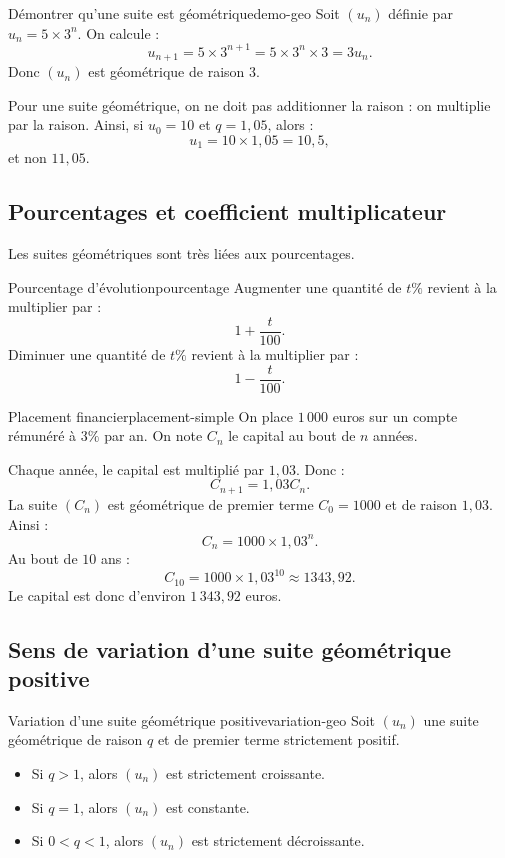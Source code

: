 \documentclass[11pt,a4paper]{article}
\begin{document}
\begin{examplebox}{Démontrer qu'une suite est géométrique}{demo-geo}
Soit $(u_n)$ définie par $u_n=5\times 3^n$.
On calcule :
\[
 u_{n+1}=5\times 3^{n+1}=5\times 3^n\times 3=3u_n.
\]
Donc $(u_n)$ est géométrique de raison $3$.
\end{examplebox}

\begin{warningbox}
Pour une suite géométrique, on ne doit pas additionner la raison : on multiplie par la raison.
Ainsi, si $u_0=10$ et $q=1{,}05$, alors :
\[
 u_1=10\times1{,}05=10{,}5,
\]
et non $11{,}05$.
\end{warningbox}

\subsection{Pourcentages et coefficient multiplicateur}

Les suites géométriques sont très liées aux pourcentages.

\begin{propositionbox}{Pourcentage d'évolution}{pourcentage}
Augmenter une quantité de $t\%$ revient à la multiplier par :
\[
1+\frac{t}{100}.
\]
Diminuer une quantité de $t\%$ revient à la multiplier par :
\[
1-\frac{t}{100}.
\]
\end{propositionbox}

\begin{examplebox}{Placement financier}{placement-simple}
On place $1\,000$ euros sur un compte rémunéré à $3\%$ par an. On note $C_n$ le capital au bout de $n$ années.

Chaque année, le capital est multiplié par $1{,}03$. Donc :
\[
 C_{n+1}=1{,}03 C_n.
\]
La suite $(C_n)$ est géométrique de premier terme $C_0=1000$ et de raison $1{,}03$.
Ainsi :
\[
 C_n=1000\times1{,}03^n.
\]
Au bout de $10$ ans :
\[
 C_{10}=1000\times1{,}03^{10}\approx1343{,}92.
\]
Le capital est donc d'environ $1\,343{,}92$ euros.
\end{examplebox}

\subsection{Sens de variation d'une suite géométrique positive}

\begin{propositionbox}{Variation d'une suite géométrique positive}{variation-geo}
Soit $(u_n)$ une suite géométrique de raison $q$ et de premier terme strictement positif.
\begin{itemize}
  \item Si $q>1$, alors $(u_n)$ est strictement croissante.
  \item Si $q=1$, alors $(u_n)$ est constante.
  \item Si $0<q<1$, alors $(u_n)$ est strictement décroissante.
\end{itemize}
\end{propositionbox}
\end{document}

